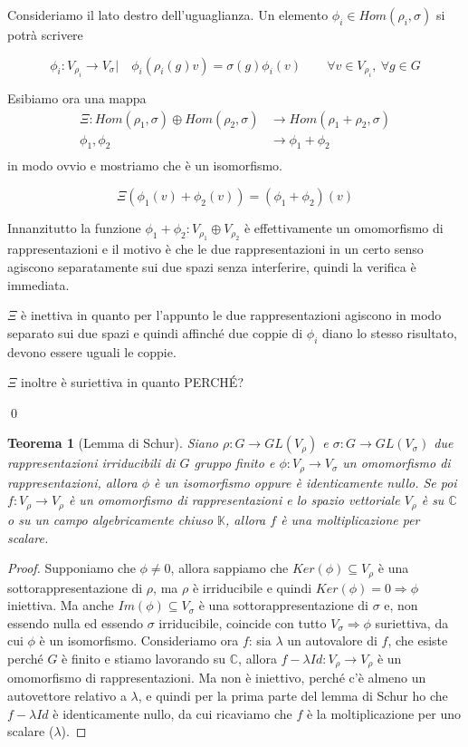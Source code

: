 \documentclass[11pt]{article}
\theoremstyle{plain}
\newtheorem{thm}{Teorema}[section]
\theoremstyle{definition}
\theoremstyle{remark}
\newcommand{\C}{\mathbb{C}}
\newcommand{\K}{\mathbb{K}}
\begin{document}
Consideriamo il lato destro dell'uguaglianza. Un elemento $\phi_i \in Hom(\rho_i, \sigma)$ si potrà scrivere

\[
\phi_i :V_{\rho_i} \to V_\sigma | \quad \phi_i\left( \rho_i(g) v\right) = \sigma(g) \phi_i(v) \qquad \forall v \in V_{\rho_i}, \ \forall g \in G 
\]

Esibiamo ora una mappa 
\begin{align*}
\Xi :  Hom(\rho_1, \sigma) \oplus Hom(\rho_2, \sigma) &\to Hom(\rho_1 + \rho_2, \sigma) \\
\phi_1 , \phi_2                                       &\to \phi_1 + \phi_2 \\
\end{align*}
 in modo ovvio e mostriamo che è un isomorfismo. 

\[ \Xi (\phi_1(v) + \phi_2(v)) = (\phi_1 + \phi_2) (v) \]


Innanzitutto la funzione $\phi_1 + \phi_2 : V_{\rho_1} \oplus V_{\rho_2}$ è effettivamente un omomorfismo di rappresentazioni e il motivo è che le due rappresentazioni in un certo senso agiscono separatamente sui due spazi senza interferire, quindi la verifica è immediata. 

$\Xi$ è inettiva in quanto per l'appunto le due rappresentazioni agiscono in modo separato sui due spazi e quindi affinché due coppie di $\phi_i$ diano lo stesso risultato, devono essere uguali le coppie.

$\Xi$ inoltre è suriettiva in quanto PERCHÉ? 

\qed


\begin{thm}[Lemma di Schur]
Siano $\rho: G \to GL(V_\rho)$ e $\sigma: G \to GL(V_\sigma)$ due rappresentazioni irriducibili di $G$ gruppo finito e $\phi:V_\rho \to V_\sigma$ un omomorfismo di rappresentazioni, allora $\phi$ è un isomorfismo oppure è identicamente nullo. Se poi $f:V_\rho\to V_\rho$ è un omomorfismo di rappresentazioni e lo spazio vettoriale $V_\rho$ è su $\C$ o su un campo algebricamente chiuso $\K$, allora $f$ è una moltiplicazione per scalare.
\end{thm}
\begin{proof}
Supponiamo che $\phi\neq 0$, allora sappiamo che $Ker(\phi)\subseteq V_\rho$ è una sottorappresentazione di $\rho$, ma $\rho$ è irriducibile e quindi $Ker(\phi)=0\Rightarrow \phi$ iniettiva. Ma anche $Im(\phi)\subseteq V_{\sigma}$ è una sottorappresentazione di $\sigma$ e, non essendo nulla ed essendo $\sigma$ irriducibile, coincide con tutto $V_\sigma \Rightarrow \phi$ suriettiva, da cui $\phi$ è un isomorfismo.
Consideriamo ora $f$: sia $\lambda$ un autovalore di $f$, che esiste perché $G$ è finito e stiamo lavorando su $\C$, allora $f-\lambda Id:V_\rho\to V_\rho$ è un omomorfismo di rappresentazioni. Ma non è iniettivo, perché c'è almeno un autovettore relativo a $\lambda$, e quindi per la prima parte del lemma di Schur ho che $f-\lambda Id$ è identicamente nullo, da cui ricaviamo che $f$ è la moltiplicazione per uno scalare ($\lambda$).
\end{proof}
\end{document}
